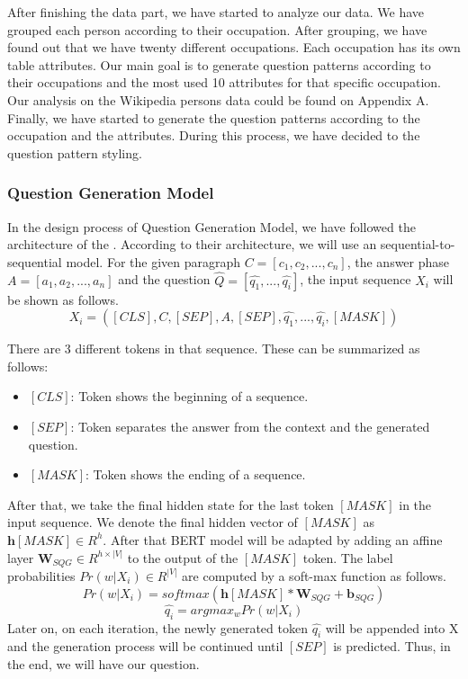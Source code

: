 \documentclass{mefsdp}
\begin{document}
	After finishing the data part, we have started to analyze our data. We have grouped each person according to their occupation. After grouping, we have found out that we have twenty different occupations. Each occupation has its own table attributes. Our main goal is to generate question patterns according to their occupations and the most used 10 attributes for that specific occupation. Our analysis on the Wikipedia persons data could be found on Appendix A.\\
	
	Finally, we have started to generate the question patterns according to the occupation and the attributes. During this process, we have decided to the question pattern styling.\\
	
	\subsubsection{Question Generation Model}\label{qgmodel-design}
	In the design process of Question Generation Model, we have followed the architecture of the \cite{chan-fan-2019-recurrent}. According to their architecture, we will use an sequential-to-sequential model. For the given paragraph $C=[c_1, c_2, ..., c_n]$, the answer phase $A=[a_1, a_2, ..., a_n]$ and the question $\hat{Q} = [\hat{q_1}, ..., \hat{q_i}]$, the input sequence $X_i$ will be shown as follows.
	\begin{equation}
		X_i =  ([CLS], C, [SEP], A, [SEP], \hat{q_1}, ..., \hat{q_i}, [MASK])\label{formula1}
	\end{equation}

	 There are 3 different tokens in that sequence. These can be summarized as follows:
	\begin{itemize}
		\item \textit{$[CLS]$}: Token shows the beginning of a sequence.
		\item \textit{$[SEP]$}: Token separates the answer from the context and the generated question.
		\item \textit{$[MASK]$}: Token shows the ending of a sequence.
	\end{itemize}

	After that, we take the final hidden state for the last token \textit{$[MASK]$} in the input sequence. We denote the final hidden vector of \textit{$[MASK]$} as $\textbf{h}[MASK] \in \textit{R}^{h}$. After that BERT model will be adapted by adding an affine layer $\textbf{W}_{SQG} \in \textit{R}^{h×|V|}$ to the output of the \textit{$[MASK]$} token. The label probabilities  $Pr(w|X_i) \in \textit{R}^{|V|}$ are computed by a soft-max function as follows. 
	\begin{equation}
		Pr(w|X_i) = softmax(\textbf{h}[MASK] * \textbf{W}_{SQG} + \textbf{b}_{SQG})
	\end{equation}
	\begin{equation}
		\hat{q_i} = argmax_{w}Pr(w|X_i)
	\end{equation}
	Later on, on each iteration, the newly generated token $\hat{q_i}$ will be appended into X and the generation process will be continued until \textit{$[SEP]$} is predicted. Thus, in the end, we will have our question.
\end{document}
